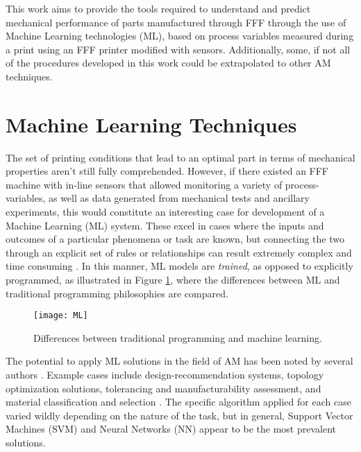 \documentclass[main.tex]{subfiles}
\begin{document}
This work aims to provide the tools required to understand and predict mechanical performance of parts manufactured through FFF through the use of Machine Learning technologies (ML), based on process variables measured during a print using an FFF printer modified with sensors. Additionally, some, if not all of the procedures developed in this work could be extrapolated to other AM techniques.

\section{Machine Learning Techniques} \label{sec:ml}

The set of printing conditions that lead to an optimal part in terms of mechanical properties aren't still fully comprehended. However, if there existed an FFF machine with in-line sensors that allowed monitoring a variety of process-variables, as well as data generated from mechanical tests and ancillary experiments, this would constitute an interesting case for development of a Machine Learning (ML) system. These excel in cases where the inputs and outcomes of a particular phenomena or task are known, but connecting the two through an explicit set of rules or relationships can result extremely complex and time consuming \cite{Chollet2018}. In this manner, ML models are \emph{trained}, as opposed to explicitly programmed, as illustrated in Figure \ref{fig:MLvsP}, where the differences between ML and traditional programming philosophies are compared. 

\begin{figure}[!htbp]
	\center
	\texttt{[image: ML]}
	\caption{Differences between traditional programming and machine learning. \cite{Chollet2018}} \label{fig:MLvsP}
\end{figure}

The potential to apply ML solutions in the field of AM has been noted by several authors \cite{Razvi2019,Meng2020}. Example cases include design-recommendation systems, topology optimization solutions, tolerancing and manufacturability assessment, and material classification and selection \cite{Razvi2019}. The specific algorithm applied for each case varied wildly depending on the nature of the task, but in general, Support Vector Machines (SVM) and Neural Networks (NN) appear to be the most prevalent solutions.
\end{document}
